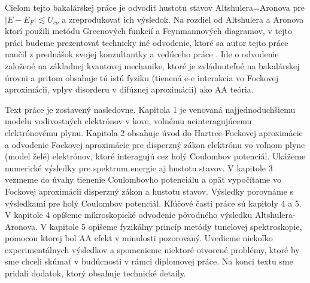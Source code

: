 Cieľom tejto bakalárskej práce je
odvodiť hustotu stavov Altshulera=Aronova pre $|E-E_F| \lesssim U_{co}$ a zreprodukovať ich výsledok. Na rozdiel od Altshulera a Aronova ktorí použili metódu Greenových funkcií a Feynmannových diagramov,
v tejto práci budeme prezentovať technicky iné odvodenie, ktoré sa autor tejto práce naučil z prednášok svojej konzultantky a vedúceho práce \cite{MoskovaUnpub1}. Ide o odvodenie založené na základnej kvantovej mechanike, ktoré je zvládnuteľné na bakalárskej úrovni a pritom obsahuje tú istú fyziku (tienená e-e interakcia vo Fockovej aproximácii, vplyv disorderu v difúznej aproximácii) ako AA teória.


Text práce je zostavený nasledovne. Kapitola 1 je venovaná najjednoduchšiemu modelu vodivostných elektrónov v kove, volnému neinteragujúcemu elektrónovému plynu.
Kapitola 2 obsahuje úvod do Hartree-Fockovej aproximácie a odvodenie Fockovej aproximácie pre disperzný zákon elektrónu vo voľnom plyne (model želé) elektrónov, ktoré interagujú
cez holý Coulombov potenciál. Ukážeme numerické výsledky pre spektrum energie aj hustotu stavov. V kapitole 3 vezmeme do úvahy tienenie Coulombovho potenciálu a opäť vypočítame vo Fockovej aproximácii disperzný zákon
  a hustotu stavov. Výsledky porovnáme s výsledkami pre holý Coulombov potenciál. Kľúčové časti práce sú kapitoly 4 a 5.
V kapitole 4 opíšeme mikroskopické odvodenie pôvodného výsledku Altshulera-Aronova. V kapitole 5 opíšeme fyzikálny princíp metódy tunelovej spektroskopie, pomocou ktorej bol AA efekt v minulosti pozorovaný. Uvedieme niekoľko
experimentálnych výsledkov a spomenieme niektoré otvorené problémy, ktoré by sme chceli skúmať v budúcnosti v rámci diplomovej práce.  Na konci textu sme pridali dodatok, ktorý obsahuje technické detaily. 